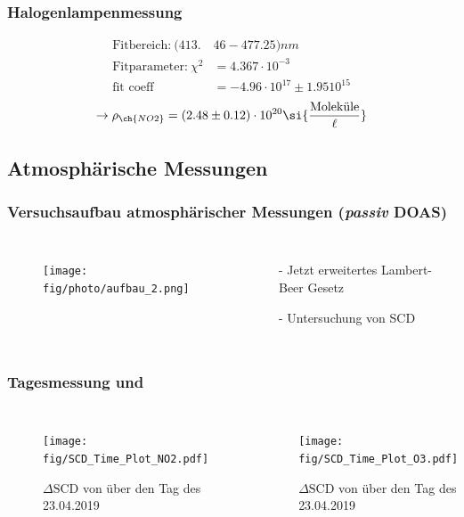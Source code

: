 \documentclass{beamer}
\begin{document}
\begin{frame}
	\frametitle{Halogenlampenmessung}
	\begin{align}
		\text{Fitbereich:}\ (413.&46 - 477.25) \si{nm}\\
		\text{Fitparameter:}\ \chi^2 &= 4.367 \cdot 10^{-3}\\
		\text{fit coeff} &= -4.96 \cdot 10^{17} \pm 1.95 10^{15}
	\end{align}
	\begin{align}    
		\to \rho_{\ch{NO2}} = (2.48 \pm 0.12) \cdot 10^{20} \si{\frac{\text{Moleküle}}{\ell}}
	\end{align}
\end{frame}

\begin{frame}
    \section{Atmosphärische Messungen}
    \frametitle{Versuchsaufbau atmosphärischer Messungen (\textit{passiv} DOAS)}
     \begin{columns}
    		\begin{figure}[h]
    			\texttt{[image: fig/photo/aufbau\_2.png]}
    		\end{figure}
    		\begin{itemize}
    			\item[-] Jetzt erweitertes Lambert-Beer Gesetz
    			\item[-] Untersuchung von SCD
    		\end{itemize}
    \end{columns}
\end{frame}

\begin{frame}
    \frametitle{Tagesmessung  und }
	\begin{columns}
	  	\begin{figure}
	  		\texttt{[image: fig/SCD\_Time\_Plot\_NO2.pdf]}
    		\caption{$\Delta \text{SCD}$ von  über den Tag des 23.04.2019}
    		\label{fig:delta_SCD_time_NO2}
        \end{figure}
    	\begin{figure}
    		\texttt{[image: fig/SCD\_Time\_Plot\_O3.pdf]}
    		\caption{$\Delta \text{SCD}$ von  über den Tag des 23.04.2019}
    		\label{fig:delta_SCD_time_O3}
    	\end{figure}  		
    \end{columns}
\end{frame}
\end{document}
